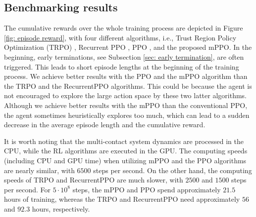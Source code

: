 \subsection{Benchmarking results}
The cumulative rewards over the whole training process are depicted in Figure \ref{fig: episode reward}, with four different algorithms, i.e., Trust Region Policy Optimization (TRPO) \cite{schulman2015trust}, Recurrent PPO \cite{huang202237}, PPO \cite{schulman2017proximal}, and the proposed mPPO. In the beginning, early terminations, see Subsection \ref{sec: early termination}, are often triggered. This leads to short episode lengths at the beginning of the training process. We achieve better results with the PPO and the mPPO algorithm than the TRPO and the RecurrentPPO algorithms. 
This could be because the agent is not encouraged to explore the large action space by these two latter algorithms. Although we achieve better results with the mPPO than the conventional PPO, the agent sometimes heuristically explores too much, which can lead to a sudden decrease in the average episode length and the cumulative reward. 
\iffalse
    \begin{figure}
    	\centering
    	\texttt{[image: figures/episode\_length.png]}
    	\caption{Evolution of episode lengths over $12500$ update steps of the optimizer.}
        \label{fig: episode length}
    \end{figure}
\fi


It is worth noting that the multi-contact system dynamics are processed in the CPU, while the RL algorithms are executed in the GPU. The computing speeds (including CPU and GPU time) when utilizing mPPO and the PPO algorithms are nearly similar, with $6500$ steps per second. On the other hand, the computing speeds of TRPO and RecurrentPPO are much slower, with $2500$ and $1500$ steps per second. For $5\cdot10^8$ steps, the mPPO and PPO spend approximately $21.5$ hours of training, whereas the TRPO and RecurrentPPO need approximately $56$ and $92.3$ hours, respectively. 


